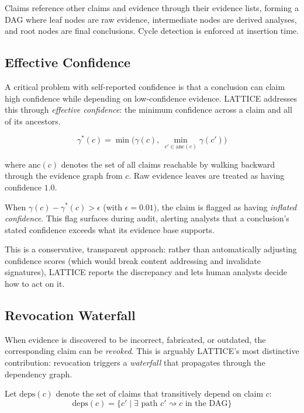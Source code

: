 \documentclass[11pt,twocolumn]{article}
\begin{document}
Claims reference other claims and evidence through their evidence lists, forming a DAG where leaf nodes are raw evidence, intermediate nodes are derived analyses, and root nodes are final conclusions. Cycle detection is enforced at insertion time.

\subsection{Effective Confidence}
\label{sec:effconf}

A critical problem with self-reported confidence is that a conclusion can claim high confidence while depending on low-confidence evidence. LATTICE addresses this through \textit{effective confidence}: the minimum confidence across a claim and all of its ancestors.

\begin{equation}
\gamma^*(c) = \min\!\Big(\gamma(c),\ \min_{c' \in \text{anc}(c)} \gamma(c')\Big)
\end{equation}

\noindent where $\text{anc}(c)$ denotes the set of all claims reachable by walking backward through the evidence graph from $c$. Raw evidence leaves are treated as having confidence $1.0$.

When $\gamma(c) - \gamma^*(c) > \epsilon$ (with $\epsilon = 0.01$), the claim is flagged as having \textit{inflated confidence}. This flag surfaces during audit, alerting analysts that a conclusion's stated confidence exceeds what its evidence base supports.

This is a conservative, transparent approach: rather than automatically adjusting confidence scores (which would break content addressing and invalidate signatures), LATTICE reports the discrepancy and lets human analysts decide how to act on it.

\subsection{Revocation Waterfall}
\label{sec:revocation}

When evidence is discovered to be incorrect, fabricated, or outdated, the corresponding claim can be \textit{revoked}. This is arguably LATTICE's most distinctive contribution: revocation triggers a \textit{waterfall} that propagates through the dependency graph.

Let $\text{deps}(c)$ denote the set of claims that transitively depend on claim $c$:
\[
\text{deps}(c) = \{c' \mid \exists \text{ path } c' \rightsquigarrow c \text{ in the DAG}\}
\]
\end{document}
